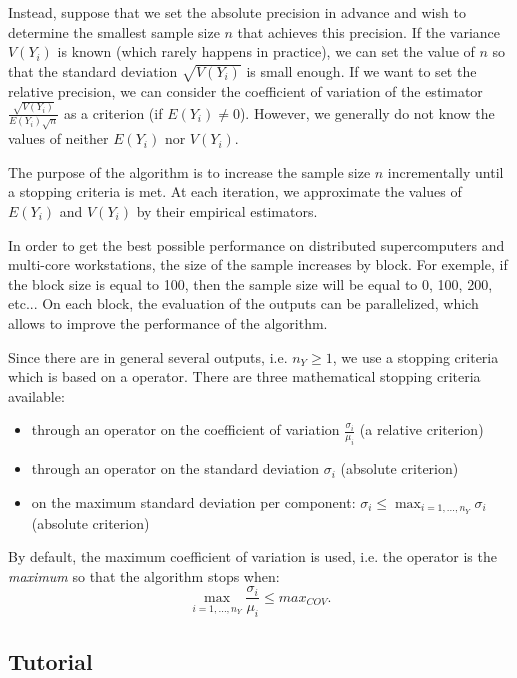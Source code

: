 \documentclass{article}
\begin{document}
Instead, suppose that we set the absolute precision in advance and wish to determine the smallest sample 
size $n$ that achieves this precision. 
If the variance $V(Y_i)$ is known (which rarely happens in practice), we can set the value of $n$ 
so that the standard deviation $\sqrt{V(Y_i)}$ is small enough. 
If we want to set the relative precision, we can consider the coefficient of variation 
of the estimator $\frac{\sqrt{V(Y_i)}}{E(Y_i)\sqrt{n}}$ as a criterion (if $E(Y_i)\neq 0$). 
However, we generally do not know the values of neither $E(Y_i)$ nor $V(Y_i)$. 

The purpose of the algorithm is to increase the 
sample size $n$ incrementally until a stopping criteria is met. 
At each iteration, we approximate the values of $E(Y_i)$ and $V(Y_i)$ by their 
empirical estimators. 

In order to get the best possible performance on distributed supercomputers and 
multi-core workstations, the size of the sample increases by block. 
For exemple, if the block size is equal to 100, then the sample size will be equal to 0, 100, 
200, etc... 
On each block, the evaluation of the outputs can be parallelized, which allows to improve the 
performance of the algorithm.

Since there are in general several outputs, i.e. $n_Y\geq 1$, we use 
a stopping criteria which is based on a operator. 
There are three mathematical stopping criteria available:
\begin{itemize} 
\item through an operator on the coefficient of variation $\frac{\sigma_i}{\mu_i}$ (a relative criterion)
\item through an operator on the standard deviation $\sigma_i$ (absolute criterion)
\item on the maximum standard deviation per component: $\sigma_i \leq \max_{i=1,...,n_Y} \sigma_i$ (absolute criterion)
\end{itemize} 

By default, the maximum coefficient of variation is used, i.e. the operator is the \emph{maximum} 
so that the algorithm stops when: 
$$
\max_{i=1,...,n_Y} \frac{\sigma_i}{\mu_i} \leq max_{COV}.
$$

\subsection{Tutorial}
\end{document}
